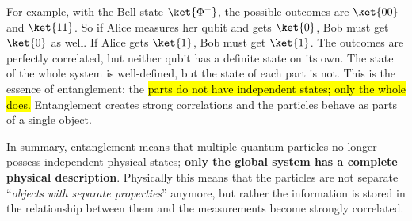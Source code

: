 \begin{deepeningbox}
    \highspace
    For example, with the Bell state $\ket{\Phi^+}$, the possible outcomes are $\ket{00}$ and $\ket{11}$. So if Alice measures her qubit and gets $\ket{0}$, Bob must get $\ket{0}$ as well. If Alice gets $\ket{1}$, Bob must get $\ket{1}$. The outcomes are perfectly correlated, but neither qubit has a definite state on its own. The state of the whole system is well-defined, but the state of each part is not. This is the essence of entanglement: the \hl{parts do not have independent states; only the whole does.} Entanglement creates strong correlations and the particles behave as parts of a single object.

    \highspace
    In summary, entanglement means that multiple quantum particles no longer possess independent physical states; \textbf{only the global system has a complete physical description}. Physically this means that the particles are not separate ``\emph{objects with separate properties}'' anymore, but rather the information is stored in the relationship between them and the measurements become strongly correlated.
\end{deepeningbox}